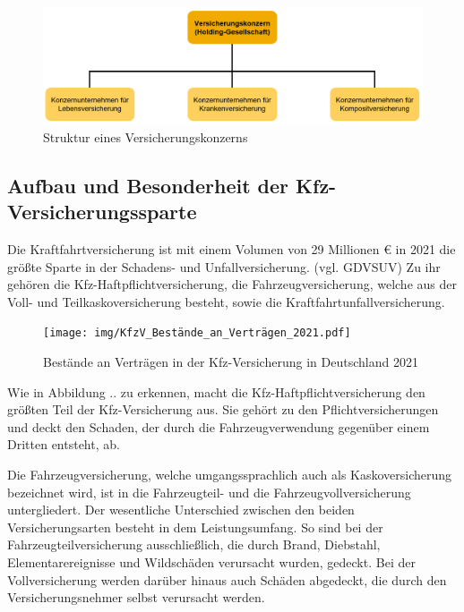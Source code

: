 \begin{figure}[h]
    \centering
    \includegraphics[width=1\textwidth]{img/Struktur_VKonzern2.jpg}
    \caption[Struktur eines Versicherungskonzerns]{Struktur eines Versicherungskonzerns\autocite{StVKonzern}}
    \label{fig:StVKonzern}
\end{figure}

\newpage

\subsection{Aufbau und Besonderheit der Kfz-Versicherungssparte}

Die Kraftfahrtversicherung ist mit einem Volumen von 29 Millionen € in 2021 die größte Sparte in der Schadens- und Unfallversicherung. (vgl. GDVSUV) Zu ihr gehören die Kfz-Haftpflichtversicherung, die Fahrzeugversicherung, welche aus der Voll- und Teilkaskoversicherung besteht, sowie die Kraftfahrtunfallversicherung.\autocite[Vgl.][S. 8]{MURRINGER2000}

\autocite[Vgl.][S. 241-243]{GDVKFZ}

\begin{figure}[h]
    \centering
    \texttt{[image: img/KfzV\_Bestände\_an\_Verträgen\_2021.pdf]}
    \caption[Bestände an Verträgen in der Kfz-Versicherung in Deutschland 2021]{Bestände an Verträgen in der Kfz-Versicherung in Deutschland 2021\autocite{KfzVVBestand}}
    \label{fig:KfzVVBestand}
\end{figure}

Wie in Abbildung .. zu erkennen, macht die Kfz-Haftpflichtversicherung den größten Teil der Kfz-Versicherung aus. Sie gehört zu den Pflichtversicherungen und deckt den Schaden, der durch die Fahrzeugverwendung gegenüber einem Dritten entsteht, ab. \autocite[Vgl.][S. 81]{STADLER2008}

Die Fahrzeugversicherung, welche umgangssprachlich auch als Kaskoversicherung bezeichnet wird, ist in die Fahrzeugteil- und die Fahrzeugvollversicherung untergliedert. Der wesentliche Unterschied zwischen den beiden Versicherungsarten besteht in dem Leistungsumfang. So sind bei der Fahrzeugteilversicherung ausschließlich, die durch Brand, Diebstahl, Elementarereignisse und Wildschäden verursacht wurden, gedeckt. Bei der Vollversicherung werden darüber hinaus auch Schäden abgedeckt, die durch den Versicherungsnehmer selbst verursacht werden.\autocite[Vgl.][S. 48]{FELTEN2012}

